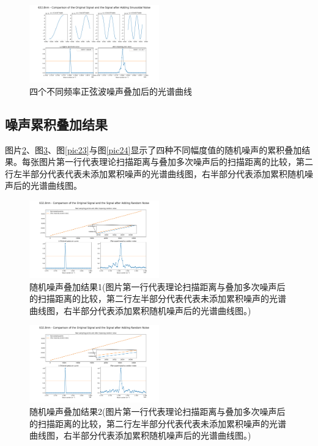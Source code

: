 \documentclass[conference]{IEEEtran}
\begin{document}
\begin{figure}[htbp]
    \centerline{\includegraphics[width=0.5\textwidth]{4种波叠加.png}}
    \caption{四个不同频率正弦波噪声叠加后的光谱曲线}
    \label{pic14}
\end{figure}

\subsection{噪声累积叠加结果}
图片\ref{pic21}、图\ref{pic22}、图\ref{pic23}与图\ref{pic24}显示了四种不同幅度值的随机噪声的累积叠加结果。每张图片第一行代表理论扫描距离与叠加多次噪声后的扫描距离的比较，第二行左半部分代表代表未添加累积噪声的光谱曲线图，右半部分代表添加累积随机噪声后的光谱曲线图。

\begin{figure}[htbp]
    \centerline{\includegraphics[width=0.5\textwidth]{随机噪声叠加1.png}}
    \caption{随机噪声叠加结果1(图片第一行代表理论扫描距离与叠加多次噪声后的扫描距离的比较，第二行左半部分代表代表未添加累积噪声的光谱曲线图，右半部分代表添加累积随机噪声后的光谱曲线图。)}
    \label{pic21}
\end{figure}

\begin{figure}[htbp]
    \centerline{\includegraphics[width=0.5\textwidth]{随机噪声叠加2.png}}
    \caption{随机噪声叠加结果2(图片第一行代表理论扫描距离与叠加多次噪声后的扫描距离的比较，第二行左半部分代表代表未添加累积噪声的光谱曲线图，右半部分代表添加累积随机噪声后的光谱曲线图。)}
    \label{pic22}
\end{figure}
\end{document}
